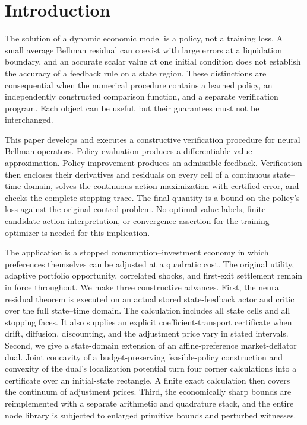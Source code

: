 \section{Introduction}\label{sec:introduction}
The solution of a dynamic economic model is a policy, not a training loss. A small average Bellman residual can coexist with large errors at a liquidation boundary, and an accurate scalar value at one initial condition does not establish the accuracy of a feedback rule on a state region. These distinctions are consequential when the numerical procedure contains a learned policy, an independently constructed comparison function, and a separate verification program. Each object can be useful, but their guarantees must not be interchanged.

This paper develops and executes a constructive verification procedure for neural Bellman operators. Policy evaluation produces a differentiable value approximation. Policy improvement produces an admissible feedback. Verification then encloses their derivatives and residuals on every cell of a continuous state--time domain, solves the continuous action maximization with certified error, and checks the complete stopping trace. The final quantity is a bound on the policy's loss against the original control problem. No optimal-value labels, finite candidate-action interpretation, or convergence assertion for the training optimizer is needed for this implication.

The application is a stopped consumption--investment economy in which preferences themselves can be adjusted at a quadratic cost. The original utility, adaptive portfolio opportunity, correlated shocks, and first-exit settlement remain in force throughout. We make three constructive advances. First, the neural residual theorem is executed on an actual stored state-feedback actor and critic over the full state--time domain. The calculation includes all state cells and all stopping faces. It also supplies an explicit coefficient-transport certificate when drift, diffusion, discounting, and the adjustment price vary in stated intervals. Second, we give a state-domain extension of an affine-preference market-deflator dual. Joint concavity of a budget-preserving feasible-policy construction and convexity of the dual's localization potential turn four corner calculations into a certificate over an initial-state rectangle. A finite exact calculation then covers the continuum of adjustment prices. Third, the economically sharp bounds are reimplemented with a separate arithmetic and quadrature stack, and the entire node library is subjected to enlarged primitive bounds and perturbed witnesses.

